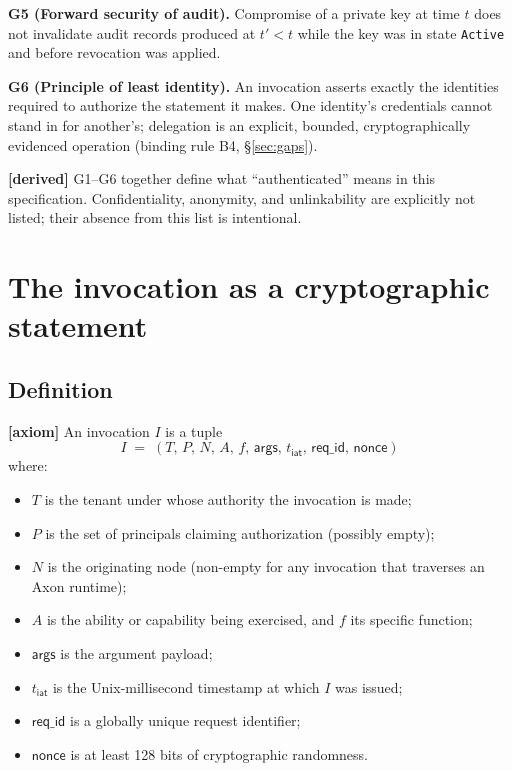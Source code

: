 \documentclass[11pt,a4paper]{article}
\newcommand{\axiom}{\textcolor{axiomcolor}{\textbf{[axiom]}}\xspace}
\newcommand{\derived}{\textcolor{derivedcolor}{\textbf{[derived]}}\xspace}
\begin{document}
\begin{property}
\textbf{G5 (Forward security of audit).}
Compromise of a private key at time $t$ does not invalidate audit
records produced at $t' < t$ while the key was in state \texttt{Active}
and before revocation was applied.
\end{property}

\begin{property}
\textbf{G6 (Principle of least identity).}
An invocation asserts exactly the identities required to authorize the
statement it makes. One identity's credentials cannot stand in for
another's; delegation is an explicit, bounded, cryptographically
evidenced operation (binding rule B4, \S\ref{sec:gaps}).
\end{property}

\derived{} G1--G6 together define what ``authenticated'' means in this
specification. Confidentiality, anonymity, and unlinkability are
explicitly not listed; their absence from this list is intentional.

\section{The invocation as a cryptographic statement}
\label{sec:statement}

\subsection{Definition}

\axiom{} An invocation $I$ is a tuple
\[
I \;=\; (T,\,P,\,N,\,A,\,f,\,\mathsf{args},\,t_{\mathsf{iat}},\,
\mathsf{req\_id},\,\mathsf{nonce})
\]
where:
\begin{itemize}[leftmargin=2em,itemsep=0.15em]
    \item $T$ is the tenant under whose authority the invocation is
    made;
    \item $P$ is the set of principals claiming authorization (possibly
    empty);
    \item $N$ is the originating node (non-empty for any invocation
    that traverses an Axon runtime);
    \item $A$ is the ability or capability being exercised, and $f$
    its specific function;
    \item $\mathsf{args}$ is the argument payload;
    \item $t_{\mathsf{iat}}$ is the Unix-millisecond timestamp at
    which $I$ was issued;
    \item $\mathsf{req\_id}$ is a globally unique request identifier;
    \item $\mathsf{nonce}$ is at least 128 bits of cryptographic
    randomness.
\end{itemize}
\end{document}
